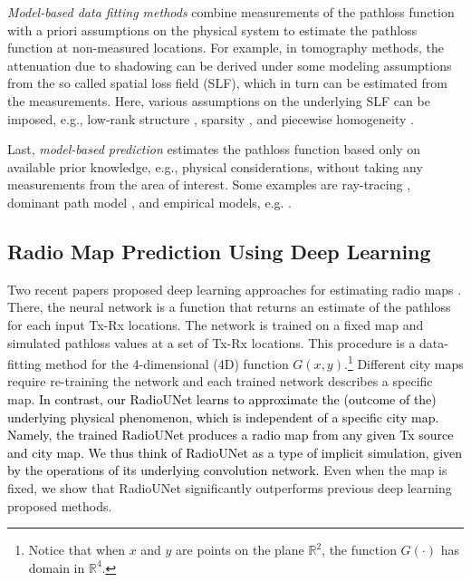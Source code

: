 \documentclass[10pt,a4paper]{article}
\begin{document}
\emph{Model-based data fitting methods} combine measurements of the pathloss function with a priori assumptions on the physical system to estimate the pathloss function at non-measured locations. For example, in tomography methods, the attenuation due to shadowing can be derived under some modeling assumptions from the so called spatial loss field (SLF), which in turn can be estimated from the measurements.
%
Here, various assumptions on the underlying SLF %
can be imposed, e.g., low-rank structure %
\cite{LowRankOutliers}, sparsity %
\cite{BlindTomo}, and piecewise homogeneity \cite{AdaptiveBayesian,VariationalBayes}. %

Last, \emph{model-based prediction} estimates the pathloss function based only on available prior knowledge, e.g., physical considerations, without taking any measurements from the area of interest. Some examples are 
ray-tracing \cite{RayTracing},
dominant path model \cite{dominantPathUrban},
and empirical models, e.g. \cite{empV2V}.

\subsection{Radio Map Prediction Using Deep Learning}
\label{Radio Map Prediction Using Deep Learning}


Two recent papers proposed deep learning approaches for estimating radio maps  \cite{DocomoCNN,DocomoTwoStep}. There, the neural network is a function that returns an estimate of the pathloss for each input Tx-Rx locations. The network is trained on a fixed map and simulated pathloss values at a set of Tx-Rx locations. This procedure is a data-fitting method for the 4-dimensional (4D) function $G(x,y)$.\footnote{Notice that when $x$ and $y$ are points on the plane $\mathbb{R}^2$, the function $G(\cdot)$ has domain in $\mathbb{R}^4$.} Different city maps require re-training the network and each trained network describes a specific map. \textcolor{black}{In contrast, our RadioUNet learns to approximate the (outcome of the) underlying physical phenomenon, which is independent of a specific city map. Namely, the trained RadioUNet produces a radio map from any given Tx source and city map. We thus think of RadioUNet as a type of implicit simulation, given by the operations of its underlying convolution network.}
 Even when the map is fixed, we show that RadioUNet significantly outperforms previous deep learning proposed methods.
 
\end{document}
